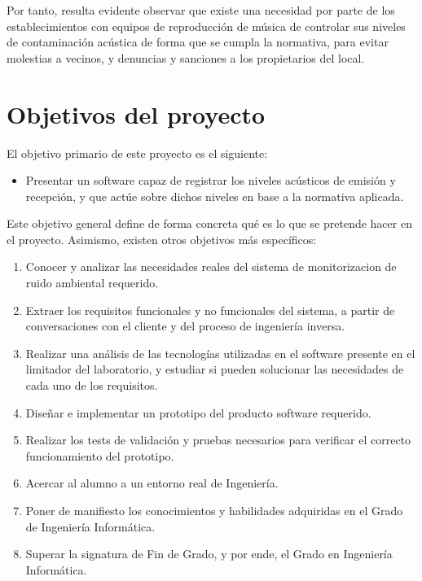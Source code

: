 Por tanto, resulta evidente observar que existe una necesidad por parte de los establecimientos con equipos de reproducción de música de controlar sus niveles de contaminación acústica de forma que se cumpla la normativa, para evitar molestias a vecinos, y denuncias y sanciones a los propietarios del local.


\section{Objetivos del proyecto}\label{sec:objetivos}

El objetivo primario de este proyecto es el siguiente:

\begin{itemize}
    \item Presentar un software capaz de registrar los niveles acústicos de emisión y recepción, y que actúe sobre dichos niveles en base a la normativa aplicada.
\end{itemize}

Este objetivo general define de forma concreta qué es lo que se pretende hacer en el proyecto. Asimismo, existen otros objetivos más específicos:

\begin{enumerate}

    \item Conocer y analizar las necesidades reales del sistema de monitorizacion de ruido ambiental requerido.

    \item Extraer los requisitos funcionales y no funcionales del sistema, a partir de conversaciones con el cliente y del proceso de ingeniería inversa.

    \item Realizar una análisis de las tecnologías utilizadas en el software presente en el limitador del laboratorio, y estudiar si pueden solucionar las necesidades de cada uno de los requisitos.

    \item Diseñar e implementar un prototipo del producto software requerido.

    \item Realizar los tests de validación y pruebas necesarios para verificar el correcto funcionamiento del prototipo.

    \item Acercar al alumno a un entorno real de Ingeniería.

    \item Poner de manifiesto los conocimientos y habilidades adquiridas en el Grado de Ingeniería Informática.

    \item Superar la signatura de Fin de Grado, y por ende, el Grado en Ingeniería Informática.
\end{enumerate}

